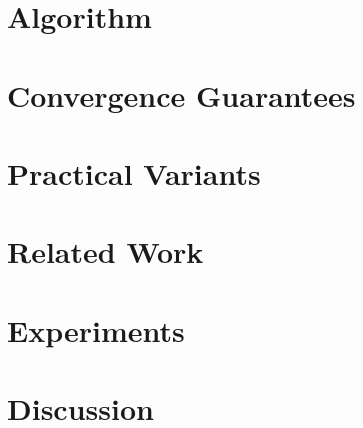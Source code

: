 \documentclass{article}
\theoremstyle{remark}
\theoremstyle{definition}
\begin{document}
\section{Algorithm}

\section{Convergence Guarantees}

\section{Practical Variants}

\section{Related Work}

\section{Experiments}

\section{Discussion}





\appendix
\end{document}
